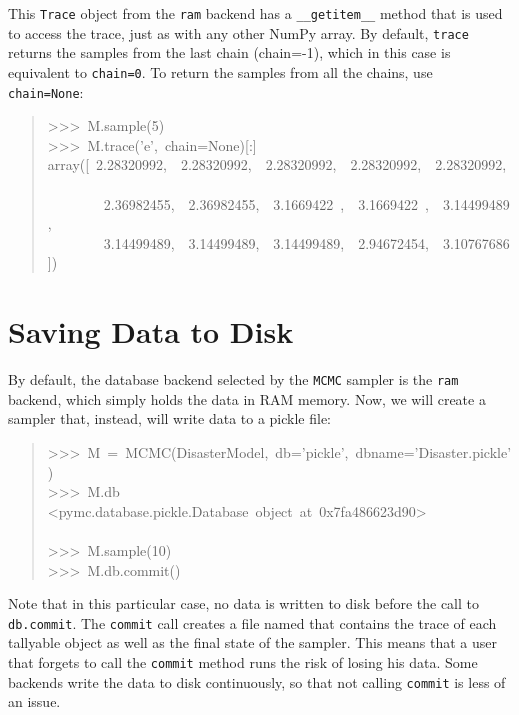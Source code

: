 This \texttt{Trace} object from the \texttt{ram} backend has a \texttt{{\_}{\_}getitem{\_}{\_}} method
that is used to access the trace, just as with any other NumPy array.
By default, \texttt{trace} returns the samples from
the last chain (chain=-1), which in this case is equivalent to \texttt{chain=0}. To
return the samples from all the chains, use \texttt{chain=None}:
\begin{quote}{\ttfamily \raggedright \noindent
>{}>{}>~M.sample(5)~\\
>{}>{}>~M.trace('e',~chain=None){[}:{]}~\\
array({[}~2.28320992,~~2.28320992,~~2.28320992,~~2.28320992,~~2.28320992,~\\
~~~~~~~~2.36982455,~~2.36982455,~~3.1669422~,~~3.1669422~,~~3.14499489,~\\
~~~~~~~~3.14499489,~~3.14499489,~~3.14499489,~~2.94672454,~~3.10767686{]})
}\end{quote}



\hypertarget{saving-data-to-disk}{}
\section*{Saving Data to Disk}
\label{saving-data-to-disk}

By default, the database backend selected by the \texttt{MCMC} sampler is the \texttt{ram}
backend, which simply holds the data in RAM memory. Now, we will create a
sampler that, instead, will write data to a pickle file:
\begin{quote}{\ttfamily \raggedright \noindent
>{}>{}>~M~=~MCMC(DisasterModel,~db='pickle',~dbname='Disaster.pickle')~\\
>{}>{}>~M.db~\\
<pymc.database.pickle.Database~object~at~0x7fa486623d90>~\\
~\\
>{}>{}>~M.sample(10)~\\
>{}>{}>~M.db.commit()
}\end{quote}

Note that in this particular case, no data is written to disk before the call
to \texttt{db.commit}. The \texttt{commit} call creates a file named 
that contains the trace of each tallyable object as well as the final state of
the sampler. This means that a user that forgets to call the \texttt{commit}
method runs the risk of losing his data. Some backends write the data to disk
continuously, so that not calling \texttt{commit} is less of an issue.

